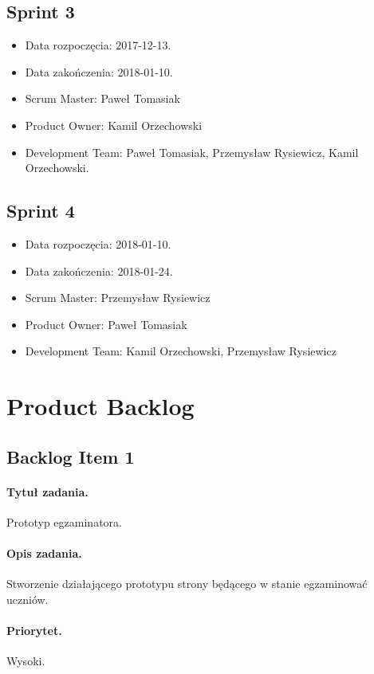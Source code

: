 \documentclass[a4paper]{article}
\begin{document}
\subsection{Sprint 3}

\begin{itemize}
\item Data rozpoczęcia: 2017-12-13.
\item  Data zakończenia: 2018-01-10.
\item Scrum Master: Paweł Tomasiak
\item Product Owner: Kamil Orzechowski
\item Development Team: Paweł Tomasiak, Przemysław Rysiewicz, Kamil Orzechowski.
\end{itemize}

\subsection{Sprint 4}

\begin{itemize}
\item Data rozpoczęcia: 2018-01-10.
\item  Data zakończenia: 2018-01-24.
\item Scrum Master: Przemysław Rysiewicz
\item Product Owner: Paweł Tomasiak
\item Development Team: Kamil Orzechowski, Przemysław Rysiewicz
\end{itemize}


\section{Product Backlog}

\subsection{Backlog Item 1}
\paragraph{Tytuł zadania.} Prototyp egzaminatora.
\paragraph{Opis zadania.} Stworzenie działającego prototypu strony będącego w stanie egzaminować uczniów.
\paragraph{Priorytet.} Wysoki.
\end{document}
